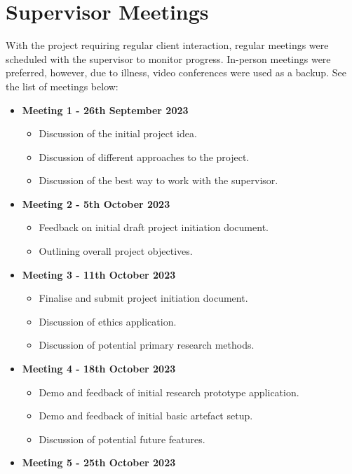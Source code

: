 \section{Supervisor Meetings}
\label{pm:supervisor_meetings}

With the project requiring regular client interaction, regular meetings were scheduled with the supervisor to monitor progress. In-person meetings were preferred, however, due to illness, video conferences were used as a backup. See the list of meetings below:

\begin{itemize}
    \item \textbf{Meeting 1 - 26th September 2023}
    \begin{itemize}
        \item Discussion of the initial project idea.
        \item Discussion of different approaches to the project.
        \item Discussion of the best way to work with the supervisor.
    \end{itemize}
    \item \textbf{Meeting 2 - 5th October 2023}
    \begin{itemize}
        \item Feedback on initial draft project initiation document.
        \item Outlining overall project objectives.
    \end{itemize}
    \item \textbf{Meeting 3 - 11th October 2023}
    \begin{itemize}
        \item Finalise and submit project initiation document.
        \item Discussion of ethics application.
        \item Discussion of potential primary research methods.
    \end{itemize}
    \item \textbf{Meeting 4 - 18th October 2023}
    \begin{itemize}
        \item Demo and feedback of initial research prototype application.
        \item Demo and feedback of initial basic artefact setup.
        \item Discussion of potential future features.
    \end{itemize}
    \item \textbf{Meeting 5 - 25th October 2023}

\end{itemize}
